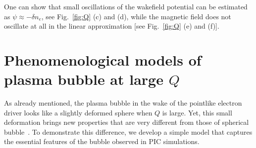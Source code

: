 \documentclass[twocolumn,showpacs,aip]{revtex4}
\begin{document}
One can show that small oscillations of the wakefield potential can be estimated as  $\psi\approx -\delta n_e$, see Fig.~\ref{fig:Q} (c) and (d), while the magnetic field does not oscillate at all in the linear approximation [see Fig.~\ref{fig:Q} (e) and (f)].  









 

\section{Phenomenological models of plasma bubble at large $Q$}
As already  mentioned,   the plasma bubble in the wake of the pointlike electron driver  looks like a slightly deformed sphere when  $Q$ is large. Yet, this small deformation brings new properties that are very different from those of spherical bubble~\cite{Kostyukov_phenomenological_2004}. 
To demonstrate this difference, we develop  a simple model that captures the essential features of  the  bubble   observed in PIC simulations. 
\end{document}
